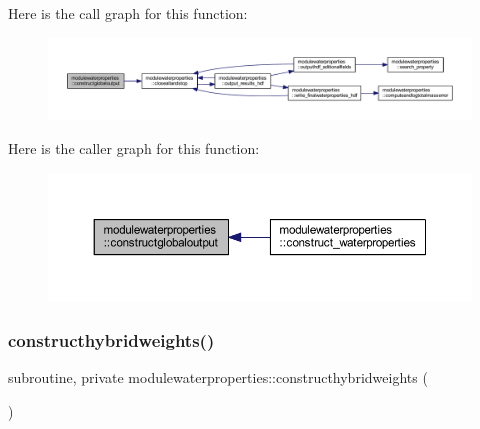 Here is the call graph for this function\+:\nopagebreak
\begin{figure}[H]
\begin{center}
\leavevmode
\includegraphics[width=350pt]{namespacemodulewaterproperties_aef6113e740cce05ecfdab1fee63873df_cgraph}
\end{center}
\end{figure}
Here is the caller graph for this function\+:\nopagebreak
\begin{figure}[H]
\begin{center}
\leavevmode
\includegraphics[width=350pt]{namespacemodulewaterproperties_aef6113e740cce05ecfdab1fee63873df_icgraph}
\end{center}
\end{figure}
\mbox{\label{namespacemodulewaterproperties_a9167d6301bd0853ded33f93fb437a619}} 
\subsubsection{\texorpdfstring{constructhybridweights()}{constructhybridweights()}}
{\footnotesize\ttfamily subroutine, private modulewaterproperties\+::constructhybridweights (\begin{DoxyParamCaption}{ }\end{DoxyParamCaption})\hspace{0.3cm}{\ttfamily [private]}}

